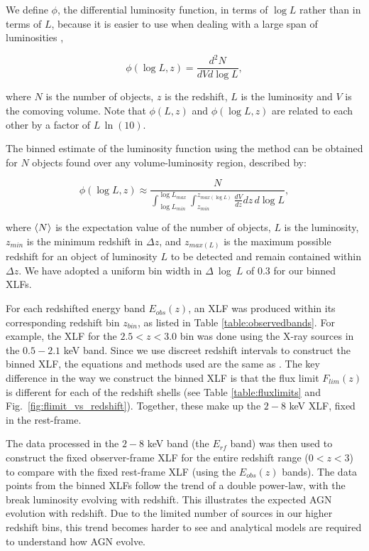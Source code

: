 \documentclass[fleqn,usenatbib]{mnras}
\begin{document}
	We define $\phi$, the differential luminosity function, in terms of $\log L$ rather than in terms of $L$, because it is easier to use when dealing with a large span of luminosities \citep{cara2008method},
	
		\begin{equation}\label{eq:xlfeq}
		\phi(\log L,z) = \frac{d^2N}{dV d \log L},
		\end{equation}
	
	\noindent where $N$ is the number of objects, $z$ is the redshift, $L$ is the luminosity and $V$ is the comoving volume. Note that $\phi(L,z)$ and $\phi(\log L,z)$ are related to each other by a factor of $L \, \ln(10)$.
		
	The binned estimate of the luminosity function using the \cite{page2000improved} method can be obtained for $N$ objects found over any volume-luminosity region, described by:
	
		\begin{equation}\label{eq:binnedxlf}
		\phi(\log L,z) \approx \frac{N}{\int_{\log L_{min}}^{\log L_{max}} \int_{z_{min}}^{z_{max(\log L)}} \frac{dV}{dz} dz \, d \log L},
		\end{equation}
	
	\noindent where $\braket{N}$ is the expectation value of the number of objects, $L$ is the luminosity, $z_{min}$ is the minimum redshift in $\Delta z$, and $z_{max(L)}$ is the maximum possible redshift for an object of luminosity $L$ to be detected and remain contained within $\Delta z$.
	We have adopted a uniform bin width in $\Delta$~log~$L$ of 0.3 for our binned XLFs.
	
	For each redshifted energy band $E_{obs}(z)$, an XLF was produced within its corresponding redshift bin $z_{bin}$, as listed in Table \ref{table:observedbands}. 
	For example, the XLF for the $2.5 < z < 3.0$ bin was done using the X-ray sources in the $0.5-2.1$ keV band. 
	Since we use discreet redshift intervals to construct the binned XLF, the equations and methods used are the same as \cite{page2000improved}.
	The key difference in the way we construct the binned XLF is that the flux limit $F_{lim}(z)$ is different for each of the redshift shells (see Table \ref{table:fluxlimits} and Fig.~\ref{fig:flimit_vs_redshift}).
	Together, these make up the $2-8$ keV XLF, fixed in the rest-frame.
	
	The data processed in the $2-8$ keV band (the $E_{rf}$ band) was then used to construct the fixed observer-frame XLF for the entire redshift range ($0 < z < 3$) to compare with the fixed rest-frame XLF (using the $E_{obs}(z)$ bands). 
	The data points from the binned XLFs follow the trend of a double power-law, with the break luminosity evolving with redshift. 
	This illustrates the expected AGN evolution with redshift.
	Due to the limited number of sources in our higher redshift bins, this trend becomes harder to see and analytical models are required to understand how AGN evolve. 
	
\end{document}
